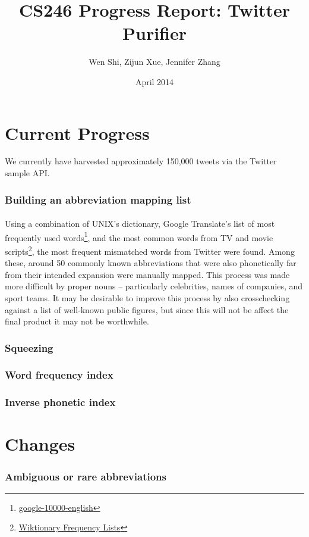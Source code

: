 \documentclass{article}
\title{CS246 Progress Report: Twitter Purifier}
\author{Wen Shi, Zijun Xue, Jennifer Zhang}
\date{April 2014}
\begin{document}
\maketitle


\section*{Current Progress}
We currently have harvested approximately 150,000 tweets via the Twitter sample API.
\subsubsection*{Building an abbreviation mapping list}
\paragraph{} Using a combination of UNIX's dictionary, Google Translate's list of most frequently used words\footnote{\href{https://github.com/first20hours/google-10000-english}{google-10000-english}}, and the most common words from TV and movie scripts\footnote{\href{http://en.wiktionary.org/wiki/Wiktionary:Frequency_lists\#TV_and_movie_scripts}{Wiktionary Frequency Lists}}, the most frequent mismatched words from Twitter were found. Among these, around 50 commonly known abbreviations that were also phonetically far from their intended expansion were manually mapped. This process was made more difficult by proper nouns -- particularly celebrities, names of companies, and sport teams. It may be desirable to improve this process by also crosschecking against a list of well-known public figures, but since this will not be affect the final product it may not be worthwhile.
\subsubsection*{Squeezing}
\subsubsection*{Word frequency index}
\subsubsection*{Inverse phonetic index}
\section*{Changes}
\subsubsection*{Ambiguous or rare abbreviations}
\end{document}
